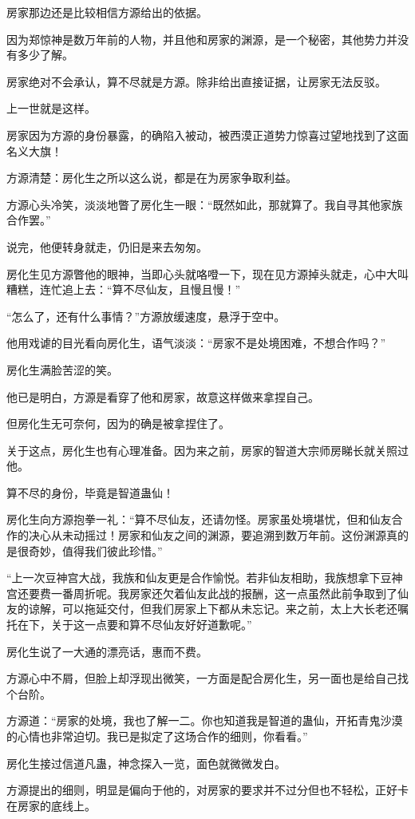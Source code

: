 \begin{this_body}
房家那边还是比较相信方源给出的依据。

因为郑惊神是数万年前的人物，并且他和房家的渊源，是一个秘密，其他势力并没有多少了解。

房家绝对不会承认，算不尽就是方源。除非给出直接证据，让房家无法反驳。

上一世就是这样。

房家因为方源的身份暴露，的确陷入被动，被西漠正道势力惊喜过望地找到了这面名义大旗！

方源清楚：房化生之所以这么说，都是在为房家争取利益。

方源心头冷笑，淡淡地瞥了房化生一眼：“既然如此，那就算了。我自寻其他家族合作罢。”

说完，他便转身就走，仍旧是来去匆匆。

房化生见方源瞥他的眼神，当即心头就咯噔一下，现在见方源掉头就走，心中大叫糟糕，连忙追上去：“算不尽仙友，且慢且慢！”

“怎么了，还有什么事情？”方源放缓速度，悬浮于空中。

他用戏谑的目光看向房化生，语气淡淡：“房家不是处境困难，不想合作吗？”

房化生满脸苦涩的笑。

他已是明白，方源是看穿了他和房家，故意这样做来拿捏自己。

但房化生无可奈何，因为的确是被拿捏住了。

关于这点，房化生也有心理准备。因为来之前，房家的智道大宗师房睇长就关照过他。

算不尽的身份，毕竟是智道蛊仙！

房化生向方源抱拳一礼：“算不尽仙友，还请勿怪。房家虽处境堪忧，但和仙友合作的决心从未动摇过！房家和仙友之间的渊源，要追溯到数万年前。这份渊源真的是很奇妙，值得我们彼此珍惜。”

“上一次豆神宫大战，我族和仙友更是合作愉悦。若非仙友相助，我族想拿下豆神宫还要费一番周折呢。我房家还欠着仙友此战的报酬，这一点虽然此前争取到了仙友的谅解，可以拖延交付，但我们房家上下都从未忘记。来之前，太上大长老还嘱托在下，关于这一点要和算不尽仙友好好道歉呢。”

房化生说了一大通的漂亮话，惠而不费。

方源心中不屑，但脸上却浮现出微笑，一方面是配合房化生，另一面也是给自己找个台阶。

方源道：“房家的处境，我也了解一二。你也知道我是智道的蛊仙，开拓青鬼沙漠的心情也非常迫切。我已是拟定了这场合作的细则，你看看。”

房化生接过信道凡蛊，神念探入一览，面色就微微发白。

方源提出的细则，明显是偏向于他的，对房家的要求并不过分但也不轻松，正好卡在房家的底线上。


\end{this_body}
